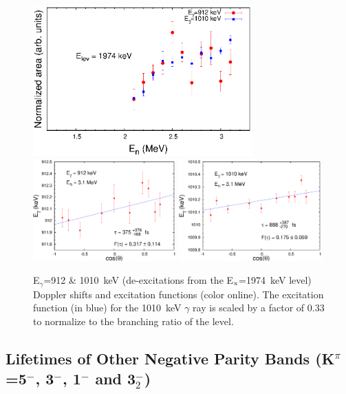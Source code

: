 \begin{figure}[h!]
\begin{center}
\includegraphics[width=0.75\textwidth]{figures/1974_ExF.eps}\\
\includegraphics[width=0.49\textwidth]{figures/912_DSAM.eps}
\includegraphics[width=0.49\textwidth]{figures/1010_DSAM.eps}

\caption{E$_\gamma$=912 \& 1010~keV (de-excitations from the E$_{\rm x}$=1974~keV level) Doppler shifts and excitation functions (color online). The excitation function (in blue) for the 1010~keV $\gamma$ ray is scaled by a factor of 0.33 to normalize to the branching ratio of the level. \label{fig:1974_DSAM_EXF}}
\end{center}
\end{figure}

\subsection{Lifetimes of Other Negative Parity Bands (K$^\pi$=5$^-$, 3$^-$, 1$^-$ and 3$^-_2$)}

